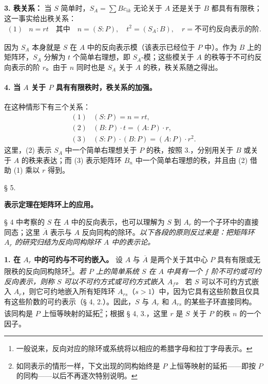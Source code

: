 \noindent\textbf{3. 秩关系：} 当 \(S\) 简单时，\(S_A=\sum Bc_{ik}\) 无论关于 \(A\) 还是关于 \(B\) 都具有有限秩；这一事实给出秩关系：
\[
\begin{array}{rl}
(1)& n=rt\quad\text{其中}\quad n=(S:P),\quad t^2=(S_A:B),\quad r=\text{不可约反向表示的阶}.
\end{array}
\]

因为 \(S_A\) 本身就是 \(S\) 在 \(A\) 中的反向表示模（该表示已经位于 \(P\) 中）。作为 \(B\) 上的矩阵环，\(S_A\) 分解为 \(t\) 个简单右理想，即 \(S_A\)-模；这些模关于 \(A\) 的秩等于不可约反向表示的阶 \(r\)。由于 \(n\) 同时也是 \(S_A\) 关于 \(A\) 的秩，秩关系随之得出。

\paragraph{4. 当 \(A\) 关于 \(P\) 具有有限秩时，秩关系的加强。}
在这种情形下有三个关系：
\[
\begin{array}{rl}
(1)& (S:P)=n=rt,\\
(2)& (B:P)\cdot t=(A:P)\cdot r,\\
(3)& (S:P)\cdot(B:P)=(A:P)\cdot r^2.
\end{array}
\]
这里，(2) 表示 \(S_A\) 中一个简单右理想关于 \(P\) 的秩，按照 3.，分别用关于 \(B\) 或关于 \(A\) 的秩来表达；而 (3) 表示矩阵环 \(B_n\) 中一个简单右理想的秩，并且由 (2) 借助 (1) 乘以 \(r\) 得到。

\begin{center}
§ 5.

\textbf{表示定理在矩阵环上的应用。}
\end{center}

§ 4 中考察的 \(S\) 在 \(A\) 中的反向表示，也可以理解为 \(S\) 到 \(A_r\) 的一个子环中的直接同态；这里 \(\overline A\) 表示与 \(A\) 反向同构的除环。\emph{以下各段的原则反过来是：把矩阵环 \(A_r\) 的研究归结为反向同构除环 \(A\) 中的表示论。}

\noindent\textbf{1. 在 \(A_r\) 中的可约与不可约嵌入。} 设 \(A\) 与 \(\overline A\) 是两个关于其中心 \(P\) 具有有限或无限秩的反向同构除环\footnote{一般说来，反向对应的除环或系统将以相应的希腊字母和拉丁字母表示。}。\emph{若 \(P\) 上的简单系统 \(S\) 在 \(A\) 中具有一个 \(f\) 阶不可约或可约反向表示，则称 \(S\) 可以不可约方式或可约方式嵌入 \(A_f\)。} 若 \(S\) 可以不可约方式嵌入 \(A_r\)，则它可约地嵌入所有矩阵环 \(A_{rs}\)（\(s>1\)）中，因为它具有这些阶数且仅具有这些阶数的可约表示（§ 4, 2.）。因此，\(S\) 与 \(A_r\) 和 \(A_{rs}\) 的某些子环直接同构。该同构是 \(P\) 上恒等映射的延拓\footnote{如同表示的情形一样，下文出现的同构始终是 \(P\) 上恒等映射的延拓——即按 \(P\) 的同构——以后不再逐次特别说明。}；根据 § 4, 3.，这里 \(r\) 是 \(S\) 关于 \(P\) 的秩 \(n\) 的一个因子。

